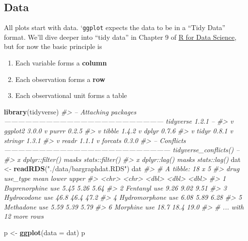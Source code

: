 \documentclass[]{book}
\newenvironment{Shaded}{\begin{snugshade}}{\end{snugshade}}
\newcommand{\CommentTok}[1]{\textcolor[rgb]{0.56,0.35,0.01}{\textit{#1}}}
\newcommand{\DataTypeTok}[1]{\textcolor[rgb]{0.13,0.29,0.53}{#1}}
\newcommand{\KeywordTok}[1]{\textcolor[rgb]{0.13,0.29,0.53}{\textbf{#1}}}
\newcommand{\NormalTok}[1]{#1}
\newcommand{\StringTok}[1]{\textcolor[rgb]{0.31,0.60,0.02}{#1}}
\providecommand{\tightlist}{%
  \setlength{\itemsep}{0pt}\setlength{\parskip}{0pt}}
\theoremstyle{definition}
\theoremstyle{definition}
\theoremstyle{definition}
\theoremstyle{remark}
\begin{document}
\hypertarget{data}{%
\subsection{Data}\label{data}}

All plots start with data. `\texttt{ggplot} expects the data to be in a
``Tidy Data'' format. We'll dive deeper into ``tidy data'' in Chapter 9
of \href{}{R for Data Science}, but for now the basic principle is

\begin{enumerate}
\def\labelenumi{\arabic{enumi}.}
\tightlist
\item
  Each variable forms a \textbf{column}
\item
  Each observation forms a \textbf{row}
\item
  Each observational unit forms a table
\end{enumerate}

\begin{Shaded}
\begin{Highlighting}[]
\KeywordTok{library}\NormalTok{(tidyverse)}
\CommentTok{#> -- Attaching packages --------------------------------------------------------------------- tidyverse 1.2.1 --}
\CommentTok{#> v ggplot2 3.0.0     v purrr   0.2.5}
\CommentTok{#> v tibble  1.4.2     v dplyr   0.7.6}
\CommentTok{#> v tidyr   0.8.1     v stringr 1.3.1}
\CommentTok{#> v readr   1.1.1     v forcats 0.3.0}
\CommentTok{#> -- Conflicts ------------------------------------------------------------------------ tidyverse_conflicts() --}
\CommentTok{#> x dplyr::filter() masks stats::filter()}
\CommentTok{#> x dplyr::lag()    masks stats::lag()}
\NormalTok{dat <-}\StringTok{ }\KeywordTok{readRDS}\NormalTok{(}\StringTok{"./data/bargraphdat.RDS"}\NormalTok{)}
\NormalTok{dat}
\CommentTok{#> # A tibble: 18 x 5}
\CommentTok{#>   drug          use_type  mean lower upper}
\CommentTok{#>   <chr>         <chr>    <dbl> <dbl> <dbl>}
\CommentTok{#> 1 Buprenorphine use       5.45  5.26  5.64}
\CommentTok{#> 2 Fentanyl      use       9.26  9.02  9.51}
\CommentTok{#> 3 Hydrocodone   use      46.8  46.4  47.2 }
\CommentTok{#> 4 Hydromorphone use       6.08  5.89  6.28}
\CommentTok{#> 5 Methadone     use       5.59  5.39  5.79}
\CommentTok{#> 6 Morphine      use      18.7  18.4  19.0 }
\CommentTok{#> # ... with 12 more rows}
\end{Highlighting}
\end{Shaded}

\begin{Shaded}
\begin{Highlighting}[]
\NormalTok{p <-}\StringTok{ }\KeywordTok{ggplot}\NormalTok{(}\DataTypeTok{data =}\NormalTok{ dat)}
\NormalTok{p}
\end{Highlighting}
\end{Shaded}
\end{document}
